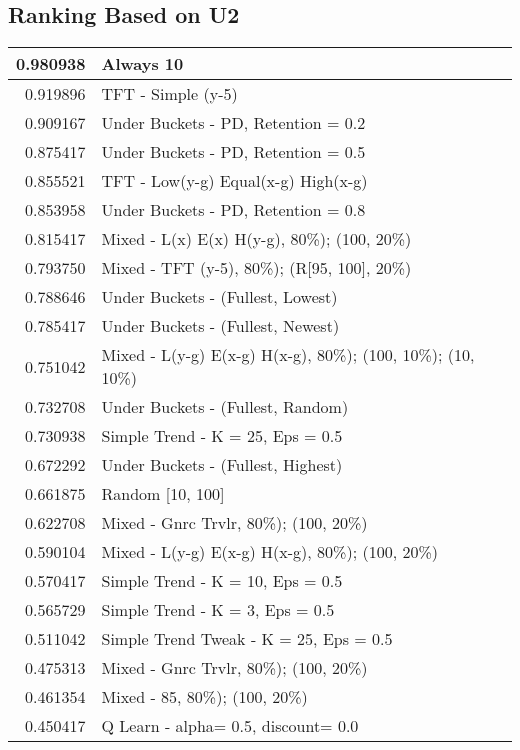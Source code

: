 \begin{table}[!hbtp]
\subsection{Ranking Based on U2}
\begin{footnotesize}
\begin{tabular}{|r|l|}\hline  \label{U3results}
0.980938 & Always 10\\ \hline
0.919896 & TFT - Simple (y-5)\\ \hline
0.909167 & Under Buckets - PD, Retention = 0.2\\ \hline
0.875417 & Under Buckets - PD, Retention = 0.5\\ \hline
0.855521 & TFT - Low(y-g) Equal(x-g) High(x-g)\\ \hline
0.853958 & Under Buckets - PD, Retention = 0.8\\ \hline
0.815417 & Mixed - {L(x) E(x) H(y-g), 80\%); (100, 20\%)}\\ \hline
0.793750 & Mixed - {TFT (y-5), 80\%); (R[95, 100], 20\%)}\\ \hline
0.788646 & Under Buckets - (Fullest, Lowest)\\ \hline
0.785417 & Under Buckets - (Fullest, Newest)\\ \hline
0.751042 & Mixed - {L(y-g) E(x-g) H(x-g), 80\%); (100, 10\%); (10, 10\%)}\\ \hline
0.732708 & Under Buckets - (Fullest, Random)\\ \hline
0.730938 & Simple Trend - K = 25, Eps = 0.5\\ \hline
0.672292 & Under Buckets - (Fullest, Highest)\\ \hline
0.661875 & Random [10, 100]\\ \hline
0.622708 & Mixed - {Gnrc Trvlr, 80\%); (100, 20\%)}\\ \hline
0.590104 & Mixed - {L(y-g) E(x-g) H(x-g), 80\%); (100, 20\%)}\\ \hline
0.570417 & Simple Trend - K = 10, Eps = 0.5\\ \hline
0.565729 & Simple Trend - K = 3, Eps = 0.5\\ \hline
0.511042 & Simple Trend Tweak - K = 25, Eps = 0.5\\ \hline
0.475313 & Mixed - {Gnrc Trvlr, 80\%); (100, 20\%)}\\ \hline
0.461354 & Mixed - {85, 80\%); (100, 20\%)}\\ \hline
0.450417 & Q Learn - alpha= 0.5, discount= 0.0\\ \hline

\end{tabular}
\end{footnotesize}
\end{table}
